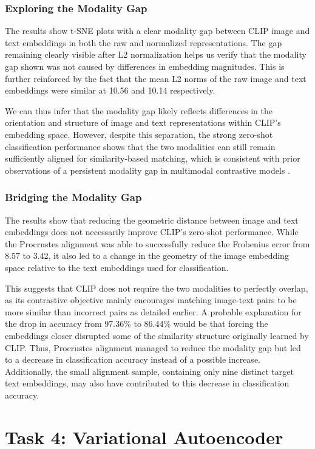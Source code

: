 \documentclass{article}
\begin{document}
\subsubsection{Exploring the Modality Gap}
The results show t-SNE plots with a clear modality gap between CLIP image and text embeddings in both the raw and normalized representations. The gap remaining clearly visible after L2 normalization helps us verify that the modality gap shown was not caused by differences in embedding magnitudes. This is further reinforced by the fact that the mean L2 norms of the raw image and text embeddings were similar at 10.56 and 10.14 respectively.

We can thus infer that the modality gap likely reflects differences in the orientation and structure of image and text representations within CLIP's embedding space. However, despite this separation, the strong zero-shot classification performance shows that the two modalities can still remain sufficiently aligned for similarity-based matching, which is consistent with prior observations of a persistent modality gap in multimodal contrastive models \citep{liang2022mind}.

\subsubsection{Bridging the Modality Gap}
The results show that reducing the geometric distance between image and text embeddings does not necessarily improve CLIP's zero-shot performance. While the Procrustes alignment was able to successfully reduce the Frobenius error from 8.57 to 3.42, it also led to a change in the geometry of the image embedding space relative to the text embeddings used for classification.

This suggests that CLIP does not require the two modalities to perfectly overlap, as its contrastive objective mainly encourages matching image-text pairs to be more similar than incorrect pairs as detailed earlier. A probable explanation for the drop in accuracy from 97.36\% to 86.44\% would be that forcing the embeddings closer disrupted some of the similarity structure originally learned by CLIP. Thus, Procrustes alignment managed to reduce the modality gap but led to a decrease in classification accuracy instead of a possible increase. Additionally, the small alignment sample, containing only nine distinct target text embeddings, may also have contributed to this decrease in classification accuracy.


\section{Task 4: Variational Autoencoder}
\end{document}
